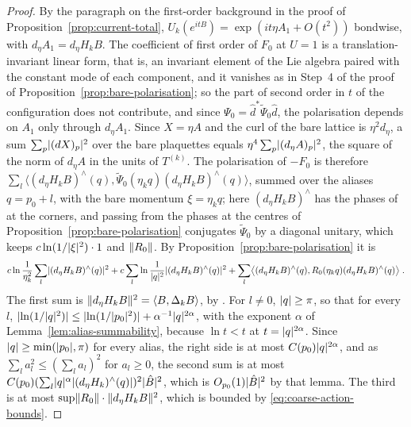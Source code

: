 \documentclass[11pt]{preprint}
\DeclarePairedDelimiter{\abs}{\lvert}{\rvert}
\DeclarePairedDelimiter{\norm}{\lVert}{\rVert}
\numberwithin{equation}{section}
\theoremstyle{definition}
\theoremstyle{remark}
\theoremstyle{plain}
\begin{document}
\begin{proof}
By the paragraph on the first-order background in the proof of Proposition~\ref{prop:current-total}, $U_k(e^{itB}) = \exp(it\eta A_1 + O(t^2))$ bondwise, with $d_\eta A_1 = d_\eta H_kB$. The coefficient of first order of $F_0$ at $U = 1$ is a translation-invariant linear form, that is, an invariant element of the Lie algebra paired with the constant mode of each component, and it vanishes as in Step~4 of the proof of Proposition~\ref{prop:bare-polarisation}; so the part of second order in $t$ of the configuration does not contribute, and since $\Psi_0 = \hat d^*\tilde\Psi_0\hat d$, the polarisation depends on $A_1$ only through $d_\eta A_1$. Since $X = \eta A$ and the curl of the bare lattice is $\eta^2d_\eta$, a sum $\sum_p\abs{(dX)_p}^2$ over the bare plaquettes equals $\eta^4\sum_p\abs{(d_\eta A)_p}^2$, the square of the norm of $d_\eta A$ in the units of $T^{(k)}$. The polarisation of $-F_0$ is therefore $\sum_l\langle(d_\eta H_kB)^\wedge(q), \tilde\Psi_0(\eta_kq)(d_\eta H_kB)^\wedge(q)\rangle$, summed over the aliases $q = p_0 + l$, with the bare momentum $\xi = \eta_kq$; here $(d_\eta H_kB)^\wedge$ has the phases of \cite{BalabanPRT1} at the corners, and passing from the phases at the centres of Proposition~\ref{prop:bare-polarisation} conjugates $\tilde\Psi_0$ by a diagonal unitary, which keeps $c\ln(1/\abs{\xi}^2)\cdot 1$ and $\norm{R_0}$. By Proposition~\ref{prop:bare-polarisation} it is
\begin{equation}\label{eq:bare-from-top}
    c\ln\frac{1}{\eta_k^2}\sum_l\abs{(d_\eta H_kB)^\wedge(q)}^2 + c\sum_l\ln\frac{1}{\abs{q}^2}\abs{(d_\eta H_kB)^\wedge(q)}^2 + \sum_l\bigl\langle(d_\eta H_kB)^\wedge(q), R_0(\eta_kq)(d_\eta H_kB)^\wedge(q)\bigr\rangle\;.
\end{equation}
The first sum is $\norm{d_\eta H_kB}^2 = \langle B, \Delta_kB\rangle$, by \cite[(1.65), p.~29]{BalabanPRT1}. For $l \neq 0$, $\abs{q} \geq \pi$, so that for every $l$, $\abs{\ln(1/\abs{q}^2)} \leq \abs{\ln(1/\abs{p_0}^2)} + \alpha^{-1}\abs{q}^{2\alpha}$, with the exponent $\alpha$ of Lemma~\ref{lem:alias-summability}, because $\ln t < t$ at $t = \abs{q}^{2\alpha}$. Since $\abs{q} \geq \min(\abs{p_0}, \pi)$ for every alias, the right side is at most $C(p_0)\abs{q}^{2\alpha}$, and as $\sum_la_l^2 \leq (\sum_la_l)^2$ for $a_l \geq 0$, the second sum is at most $C(p_0)(\sum_l\abs{q}^\alpha\abs{(d_\eta H_k)^\wedge(q)})^2\abs{\hat B}^2$, which is $O_{p_0}(1)\abs{\hat B}^2$ by that lemma. The third is at most $\sup\norm{R_0}\cdot\norm{d_\eta H_kB}^2$, which is bounded by \eqref{eq:coarse-action-bounds}.
\end{proof}
\end{document}

